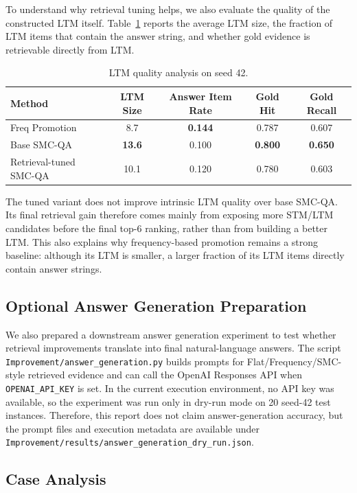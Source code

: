 \documentclass{article}
\begin{document}
To understand why retrieval tuning helps, we also evaluate the quality of the constructed LTM itself. Table~\ref{tab:ltm-quality} reports the average LTM size, the fraction of LTM items that contain the answer string, and whether gold evidence is retrievable directly from LTM.

\begin{table}[h]
\centering
\caption{LTM quality analysis on seed 42.}
\label{tab:ltm-quality}
\begin{tabular}{lcccc}
\toprule
\textbf{Method} & \textbf{LTM Size} & \textbf{Answer Item Rate} & \textbf{Gold Hit} & \textbf{Gold Recall} \\
\midrule
Freq Promotion & 8.7 & \textbf{0.144} & 0.787 & 0.607 \\
Base SMC-QA & \textbf{13.6} & 0.100 & \textbf{0.800} & \textbf{0.650} \\
Retrieval-tuned SMC-QA & 10.1 & 0.120 & 0.780 & 0.603 \\
\bottomrule
\end{tabular}
\end{table}

The tuned variant does not improve intrinsic LTM quality over base SMC-QA. Its final retrieval gain therefore comes mainly from exposing more STM/LTM candidates before the final top-6 ranking, rather than from building a better LTM. This also explains why frequency-based promotion remains a strong baseline: although its LTM is smaller, a larger fraction of its LTM items directly contain answer strings.

\subsection{Optional Answer Generation Preparation}

We also prepared a downstream answer generation experiment to test whether retrieval improvements translate into final natural-language answers. The script \texttt{Improvement/answer\_generation.py} builds prompts for Flat/Frequency/SMC-style retrieved evidence and can call the OpenAI Responses API when \texttt{OPENAI\_API\_KEY} is set. In the current execution environment, no API key was available, so the experiment was run only in dry-run mode on 20 seed-42 test instances. Therefore, this report does not claim answer-generation accuracy, but the prompt files and execution metadata are available under \texttt{Improvement/results/answer\_generation\_dry\_run.json}.

\subsection{Case Analysis}
\end{document}

